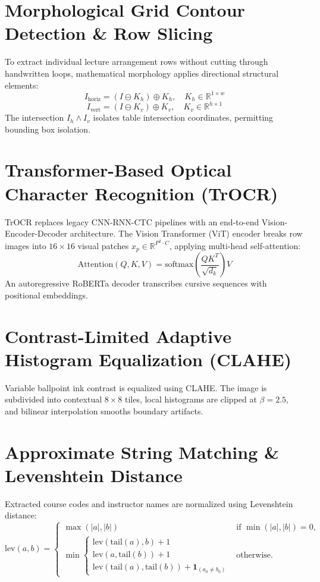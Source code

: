 \documentclass[12pt,letterpaper]{report}
\begin{document}
\section{Morphological Grid Contour Detection \& Row Slicing}
To extract individual lecture arrangement rows without cutting through handwritten loops, mathematical morphology applies directional structural elements:
\begin{equation}
I_{\text{horiz}} = (I \ominus K_h) \oplus K_h, \quad K_h \in \mathbb{R}^{1 \times w}
\end{equation}
\begin{equation}
I_{\text{vert}} = (I \ominus K_v) \oplus K_v, \quad K_v \in \mathbb{R}^{h \times 1}
\end{equation}
The intersection $I_h \land I_v$ isolates table intersection coordinates, permitting bounding box isolation.

\section{Transformer-Based Optical Character Recognition (TrOCR)}
TrOCR replaces legacy CNN-RNN-CTC pipelines with an end-to-end Vision-Encoder-Decoder architecture. The Vision Transformer (ViT) encoder breaks row images into $16 \times 16$ visual patches $x_p \in \mathbb{R}^{P^2 \cdot C}$, applying multi-head self-attention:
\begin{equation}
\text{Attention}(Q, K, V) = \text{softmax}\left(\frac{QK^T}{\sqrt{d_k}}\right)V
\end{equation}
An autoregressive RoBERTa decoder transcribes cursive sequences with positional embeddings.

\section{Contrast-Limited Adaptive Histogram Equalization (CLAHE)}
Variable ballpoint ink contrast is equalized using CLAHE. The image is subdivided into contextual $8 \times 8$ tiles, local histograms are clipped at $\beta = 2.5$, and bilinear interpolation smooths boundary artifacts.

\section{Approximate String Matching \& Levenshtein Distance}
Extracted course codes and instructor names are normalized using Levenshtein distance:
\begin{equation}
\text{lev}(a, b) = \begin{cases}
\max(|a|, |b|) & \text{if } \min(|a|, |b|) = 0, \\
\min \begin{cases}
\text{lev}(\text{tail}(a), b) + 1 \\
\text{lev}(a, \text{tail}(b)) + 1 \\
\text{lev}(\text{tail}(a), \text{tail}(b)) + \mathbf{1}_{(a_0 \neq b_0)}
\end{cases} & \text{otherwise.}
\end{cases}
\end{equation}
\end{document}
